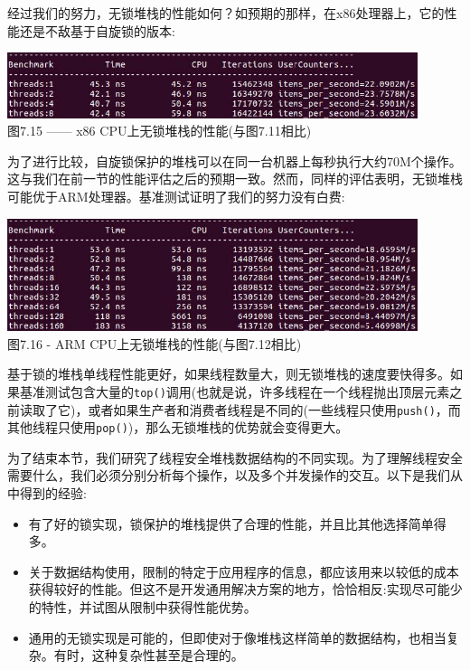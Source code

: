 经过我们的努力，无锁堆栈的性能如何？如预期的那样，在x86处理器上，它的性能还是不敌基于自旋锁的版本:

\begin{center}
\includegraphics[width=0.9\textwidth]{content/2/chapter7/images/15.jpg}\\ 
图7.15 —— x86 CPU上无锁堆栈的性能(与图7.11相比)
\end{center}

为了进行比较，自旋锁保护的堆栈可以在同一台机器上每秒执行大约70M个操作。这与我们在前一节的性能评估之后的预期一致。然而，同样的评估表明，无锁堆栈可能优于ARM处理器。基准测试证明了我们的努力没有白费:

\begin{center}
\includegraphics[width=0.9\textwidth]{content/2/chapter7/images/16.jpg}\\ 
图7.16 - ARM CPU上无锁堆栈的性能(与图7.12相比)
\end{center}

基于锁的堆栈单线程性能更好，如果线程数量大，则无锁堆栈的速度要快得多。如果基准测试包含大量的\texttt{top()}调用(也就是说，许多线程在一个线程抛出顶层元素之前读取了它)，或者如果生产者和消费者线程是不同的(一些线程只使用\texttt{push()}，而其他线程只使用\texttt{pop()})，那么无锁堆栈的优势就会变得更大。

为了结束本节，我们研究了线程安全堆栈数据结构的不同实现。为了理解线程安全需要什么，我们必须分别分析每个操作，以及多个并发操作的交互。以下是我们从中得到的经验:

\begin{itemize}
\item 
有了好的锁实现，锁保护的堆栈提供了合理的性能，并且比其他选择简单得多。

\item 
关于数据结构使用，限制的特定于应用程序的信息，都应该用来以较低的成本获得较好的性能。但这不是开发通用解决方案的地方，恰恰相反:实现尽可能少的特性，并试图从限制中获得性能优势。

\item 
通用的无锁实现是可能的，但即使对于像堆栈这样简单的数据结构，也相当复杂。有时，这种复杂性甚至是合理的。

\end{itemize}

